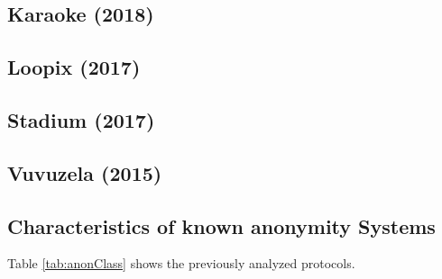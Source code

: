 %

\subsection{Karaoke (2018)}
\cite{lazar2018karaoke}

%

\subsection{Loopix (2017)}
\cite{piotrowska2017loopix}

%

\subsection{Stadium (2017)}
\cite{tyagi2017stadium}

%

\subsection{Vuvuzela (2015)}
\cite{van2015vuvuzela}

%





\subsection{Characteristics of known anonymity Systems}
Table \ref{tab:anonClass} shows the previously analyzed protocols.

